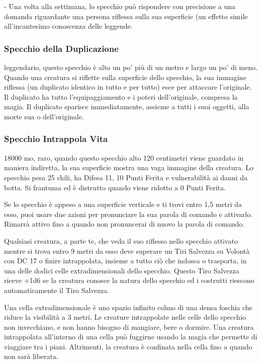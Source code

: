\begin{multicols}{2}
	- Una volta alla settimana, lo specchio può rispondere con precisione a una domanda riguardante una persona riflessa sulla sua superficie (un effetto simile all’incantesimo conoscenza delle leggende.

	\subsubsection*{Specchio della Duplicazione}
	leggendario, questo specchio è alto un po’ più di un metro e largo un po’ di meno. Quando una creatura si riflette sulla superficie dello specchio, la sua immagine riflessa (un duplicato identico in tutto e per tutto) esce per attaccare l'originale. Il duplicato ha tutto l’equipaggiamento e i poteri dell'originale, compresa la magia. Il duplicato sparisce immediatamente, assieme a tutti i suoi oggetti, alla morte sua o dell'originale.

	\subsubsection*{Specchio Intrappola Vita}
	18000 mo, raro, quando questo specchio alto 120 centimetri viene guardato in maniera indiretta, la sua superficie mostra una vaga immagine della creatura. Lo specchio pesa 25 chili, ha Difesa 11, 10 Punti Ferita e vulnerabilità ai danni da botta. Si frantuma ed è distrutto quando viene ridotto a 0 Punti Ferita.

	Se lo specchio è appeso a una superficie verticale e ti trovi entro 1,5 metri da esso, puoi usare due azioni per pronunciare la sua parola di comando e attivarlo. Rimarrà attivo fino a quando non pronuncerai di nuovo la parola di comando.

	Qualsiasi creatura, a parte te, che veda il suo riflesso nello specchio attivato mentre si trova entro 9 metri da esso deve superare un Tiri Salvezza su Volontà con DC 17 o finire intrappolata, insieme a tutto ciò che indossa o trasporta, in una delle dodici celle extradimensionali dello specchio. Questo Tiro Salvezza riceve +1d6 se la creatura conosce la natura dello specchio ed i costrutti riescono automaticamente il Tiro Salvezza.

	Una cella extradimensionale è uno spazio infinito colmo di una densa foschia che riduce la visibilità a 3 metri. Le creature intrappolate nelle celle dello specchio non invecchiano, e non hanno bisogno di mangiare, bere o dormire. Una creatura intrappolata all'interno di una cella può fuggirne usando la magia che permette di viaggiare tra i piani. Altrimenti, la creatura è confinata nella cella fino a quando non sarà liberata.


\end{multicols}
